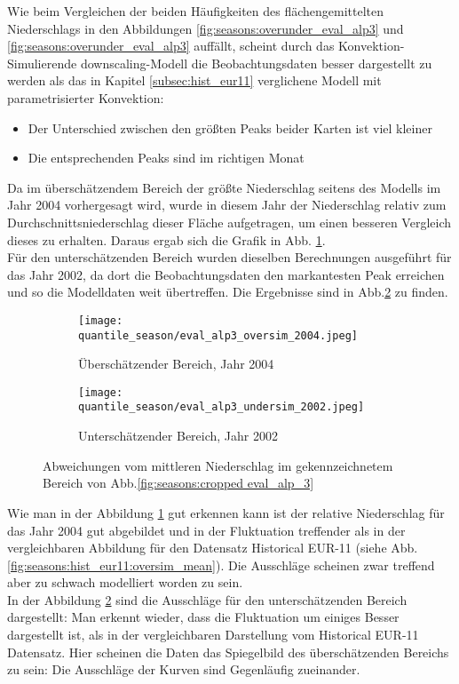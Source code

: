 Wie beim Vergleichen der beiden Häufigkeiten des flächengemittelten Niederschlags in den Abbildungen \ref{fig:seasons:overunder_eval_alp3} und \ref{fig:seasons:overunder_eval_alp3} auffällt, scheint durch das Konvektion-Simulierende downscaling-Modell die Beobachtungsdaten besser dargestellt zu werden als das in Kapitel \ref{subsec:hist_eur11} verglichene Modell mit parametrisierter Konvektion:
\begin{itemize}
	\item Der Unterschied zwischen den größten Peaks beider Karten ist viel kleiner
	\item Die entsprechenden Peaks sind im richtigen Monat
\end{itemize}
Da im überschätzendem Bereich der größte Niederschlag seitens des Modells im Jahr 2004 vorhergesagt wird, wurde in diesem Jahr der Niederschlag relativ zum Durchschnittsniederschlag dieser Fläche aufgetragen, um einen besseren Vergleich dieses zu erhalten. Daraus ergab sich die Grafik in Abb. \ref{fig:seasons:pr_oversim_eval_alp3}.\\
Für den unterschätzenden Bereich wurden dieselben Berechnungen ausgeführt für das Jahr 2002, da dort die Beobachtungsdaten den markantesten Peak erreichen und so die Modelldaten weit übertreffen. Die Ergebnisse sind in Abb.\ref{fig:seasons:pr_undersim_eval_alp3} zu finden.\\
\begin{figure}[h!]
	\begin{subfigure}{0.49\textwidth}
		\texttt{[image: quantile\_season/eval\_alp3\_oversim\_2004.jpeg]}
		\caption{Überschätzender Bereich, Jahr 2004}
		\label{fig:seasons:pr_oversim_eval_alp3}
	\end{subfigure}
	\begin{subfigure}{0.49\textwidth}
		\texttt{[image: quantile\_season/eval\_alp3\_undersim\_2002.jpeg]}
		\caption{Unterschätzender Bereich, Jahr 2002}
		\label{fig:seasons:pr_undersim_eval_alp3}
	\end{subfigure}
	\caption{Abweichungen vom mittleren Niederschlag im gekennzeichnetem Bereich von Abb.\ref{fig:seasons:cropped eval_alp_3}}
	\label{fig:seasons:pr_over_undersim_eval_alp3}
\end{figure}
Wie man in der Abbildung \ref{fig:seasons:pr_oversim_eval_alp3} gut erkennen kann ist der relative Niederschlag für das Jahr 2004 gut abgebildet und in der Fluktuation treffender als in der vergleichbaren Abbildung  für den Datensatz Historical EUR-11 (siehe Abb.\ref{fig:seasons:hist_eur11:oversim_mean}). Die Ausschläge scheinen zwar treffend aber zu schwach modelliert worden zu sein.\\
In der Abbildung \ref{fig:seasons:pr_undersim_eval_alp3} sind die Ausschläge für den unterschätzenden Bereich dargestellt: Man erkennt wieder, dass die Fluktuation um einiges Besser dargestellt ist, als in der vergleichbaren Darstellung vom Historical EUR-11 Datensatz. Hier scheinen die Daten das Spiegelbild des überschätzenden Bereichs zu sein: Die Ausschläge der Kurven sind Gegenläufig zueinander.

